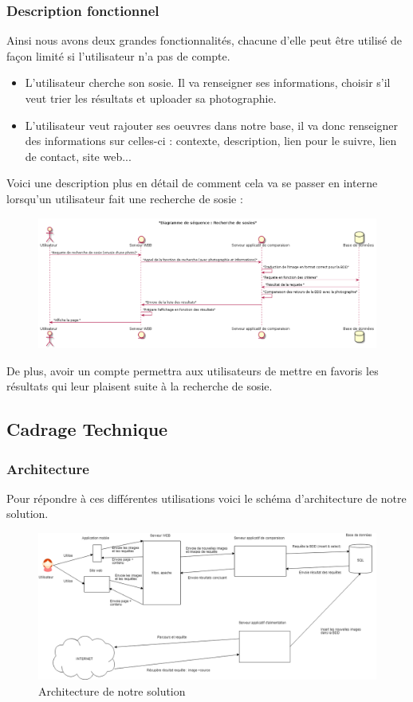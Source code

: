 \documentclass[a4paper,12pt]{article}
\begin{document}
\subsubsection{Description fonctionnel}
Ainsi nous avons deux grandes fonctionnalités, chacune d'elle peut être utilisé de façon limité si l'utilisateur n'a pas de compte. 
\begin{itemize}
    \item L'utilisateur cherche son sosie. Il va renseigner ses informations, choisir s'il veut trier les résultats et uploader sa photographie. 
    \item L'utilisateur veut rajouter ses oeuvres dans notre base, il va donc renseigner des informations sur celles-ci : contexte, description, lien pour le suivre, lien de contact, site web... 
\end{itemize}
Voici une description plus en détail de comment cela va se passer en interne lorsqu'un utilisateur fait une recherche de sosie : 
\begin{figure}[!ht]
    \centering
    \includegraphics[scale=0.3]{images/diag_scenar_mem_1.png}
    \caption{}
\end{figure}
De plus, avoir un compte permettra aux utilisateurs de mettre en favoris les résultats qui leur plaisent suite à la recherche de sosie. 

\subsection{Cadrage Technique}
\subsubsection{Architecture}
Pour répondre à ces différentes utilisations voici le schéma d'architecture de notre solution. 

\begin{figure}[!ht]
    \centering
        \includegraphics[scale=0.3]{images/Architecture_memoire_VILLER_.png}
        \caption{Architecture de notre solution}
    \end{figure}
    
\end{document}
